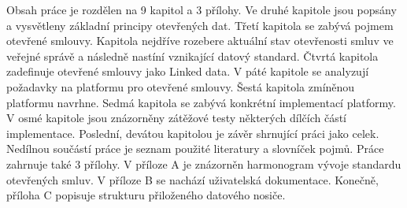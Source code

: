 Obsah práce je rozdělen na 9 kapitol a 3 přílohy. Ve druhé kapitole jsou popsány a vysvětleny základní principy otevřených dat. Třetí kapitola se zabývá pojmem otevřené smlouvy. Kapitola nejdříve rozebere aktuální stav otevřenosti smluv ve veřejné správě a následně nastíní vznikající datový standard. Čtvrtá kapitola zadefinuje otevřené smlouvy jako Linked data. V páté kapitole se analyzují požadavky na platformu pro otevřené smlouvy. Šestá kapitola zmíněnou platformu navrhne. Sedmá kapitola se zabývá konkrétní implementací platformy. V osmé kapitole jsou znázorněny zátěžové testy některých dílčích částí implementace. Poslední, devátou kapitolou je závěr shrnující práci jako celek. Nedílnou součástí práce je seznam použité literatury a slovníček pojmů. Práce zahrnuje také 3 přílohy. V příloze A je znázorněn harmonogram vývoje standardu otevřených smluv. V příloze B se nachází uživatelská dokumentace. Konečně, příloha C popisuje strukturu přiloženého datového nosiče.

